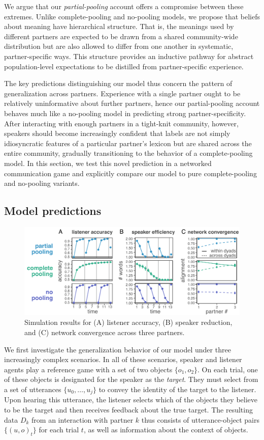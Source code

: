 We argue that our \emph{partial-pooling} account offers a compromise between these extremes.
Unlike complete-pooling and no-pooling models, we propose that beliefs about meaning have hierarchical structure.
That is, the meanings used by different partners are expected to be drawn from a shared community-wide distribution but are also allowed to differ from one another in systematic, partner-specific ways.
This structure provides an inductive pathway for abstract population-level expectations to be distilled from partner-specific experience.

The key predictions distinguishing our model thus concern the pattern of generalization across partners.
Experience with a single partner ought to be relatively uninformative about further partners, hence our partial-pooling account behaves much like a no-pooling model in predicting strong partner-specificity.
After interacting with enough partners in a tight-knit community, however, speakers should become increasingly confident that labels are not simply idiosyncratic features of a particular partner's lexicon but are shared across the entire community, gradually transitioning to the behavior of a complete-pooling model.
In this section, we test this novel prediction in a networked communication game and explicitly compare our model to pure complete-pooling and no-pooling variants.

\subsection{Model predictions}

\begin{figure}
\includegraphics[scale=1.05]{./figures/sec3-model_results.pdf}
\caption{Simulation results for (A) listener accuracy, (B) speaker reduction, and (C) network convergence across three partners.}
\label{fig:model_results}
\end{figure}

We first investigate the generalization behavior of our model under three increasingly complex scenarios. 
In all of these scenarios, speaker and listener agents play a reference game with a set of two objects $\{o_1, o_2\}$.
On each trial, one of these objects is designated for the speaker as the \emph{target}. 
They must select from a set of utterances $\{u_0, \dots, u_j\}$ to convey the identity of the target to the listener.
Upon hearing this utterance, the listener selects which of the objects they believe to be the target and then receives feedback about the true target.
The resulting data $D_k$ from an interaction with partner $k$ thus consists of utterance-object pairs $\{(u, o)_t\}$ for each trial $t$, as well as information about the context of objects.


